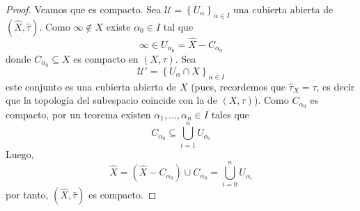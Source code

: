 \documentclass[12pt]{report}
\theoremstyle{largebreak}
\begin{document}
\begin{proof}
        Veamos que es compacto. Sea $\mathcal{U}=\left\{U_\alpha \right\}_{\alpha\in I}$ una cubierta abierta de $(\hat{X},\hat{\tau})$. Como $\infty\notin X$ existe $\alpha_0\in I$ tal que
        \begin{equation*}
            \infty\in U_{\alpha_0}=\hat{X}-C_{\alpha_0}
        \end{equation*}
        donde $C_{\alpha_0}\subseteq X$ es compacto en $(X,\tau)$. Sea
        \begin{equation*}
            \mathcal{U}'=\left\{U_\alpha\cap X \right\}_{\alpha\in I}
        \end{equation*}
        este conjunto es una cubierta abierta de $X$ (pues, recordemos que $\hat{\tau}_X=\tau$, es decir que la topología del subespacio coincide con la de $(X,\tau)$). Como $C_{\alpha_0}$ es compacto, por un teorema existen $\alpha_1,...,\alpha_n\in I$ tales que
        \begin{equation*}
            C_{\alpha_0}\subseteq\bigcup_{ i=1}^n U_{\alpha_i}
        \end{equation*}
        Luego,
        \begin{equation*}
            \hat{X}=(\hat{X}-C_{\alpha_0})\cup C_{\alpha_0}=\bigcup_{ i=0}^n U_{\alpha_i}
        \end{equation*}
        por tanto, $(\hat{X},\hat{\tau})$ es compacto.
    \end{proof}

    
    
\end{document}
